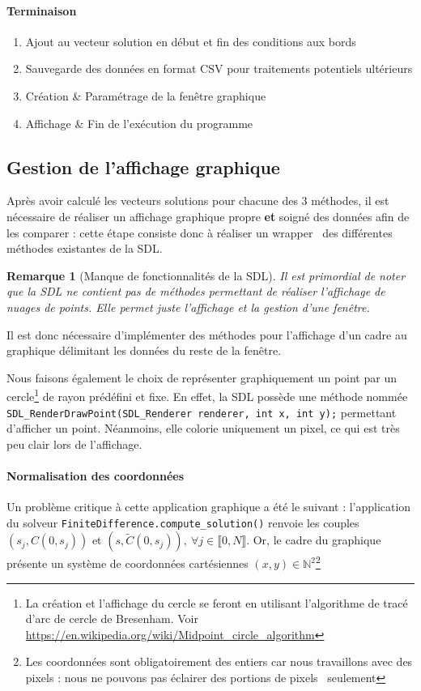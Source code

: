 \documentclass[11pt,a4paper]{article}
\newcommand*{\intval}[2]{\llbracket #1, #2 \rrbracket}
\theoremstyle{plain}
\newtheorem{rmq}{Remarque}
\begin{document}
\paragraph{Terminaison}
\begin{enumerate}
    \item Ajout au vecteur solution en début et fin des conditions aux bords
    \item Sauvegarde des données en format CSV pour traitements potentiels ultérieurs
    \item Création \& Paramétrage de la fenêtre graphique
    \item Affichage \& Fin de l'exécution du programme
\end{enumerate}




\subsection{Gestion de l'affichage graphique}
Après avoir calculé les vecteurs solutions pour chacune des 3 méthodes, il est nécessaire de réaliser un affichage graphique propre \textbf{et} soigné des données afin de les comparer : cette étape consiste donc à réaliser un \og wrapper \fg \ des différentes méthodes existantes de la SDL.

\begin{rmq}[Manque de fonctionnalités de la SDL]
Il est primordial de noter que la SDL ne contient pas de méthodes permettant de réaliser l'affichage de nuages de points. Elle permet juste l'affichage et la gestion d'une fenêtre.
\end{rmq}
Il est donc nécessaire d'implémenter des méthodes pour l'affichage d'un cadre au graphique délimitant les données du reste de la fenêtre.

Nous faisons également le choix de représenter graphiquement un point par un cercle\footnote{La création et l'affichage du cercle se feront en utilisant l'algorithme de tracé d'arc de cercle de Bresenham. Voir \url{https://en.wikipedia.org/wiki/Midpoint_circle_algorithm}} de rayon prédéfini et fixe. En effet, la SDL possède une méthode nommée \\ \texttt{SDL_RenderDrawPoint(SDL_Renderer renderer, int x, int y);} permettant d'afficher un point. Néanmoins, elle colorie uniquement un pixel, ce qui est très peu clair lors de l'affichage.

\paragraph{Normalisation des coordonnées} Un problème critique à cette application graphique a été le suivant : l'application du solveur \texttt{FiniteDifference.compute_solution()} renvoie les couples $(s_j, C(0, s_j))$ et $(s, \widetilde{C}(0, s_j)), \ \forall j \in \intval{0}{N}$.
Or, le cadre du graphique présente un système de coordonnées cartésiennes $(x, y) \in \mathbb{N}^2$\footnote{Les coordonnées sont obligatoirement des entiers car nous travaillons avec des pixels : nous ne pouvons pas éclairer des \og portions de pixels \fg \ seulement}
\end{document}
